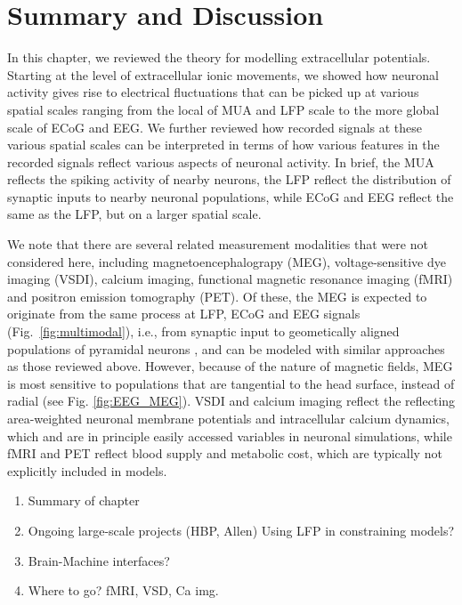 \documentclass[preprint,11pt,authoryear]{elsarticle}
\begin{document}
\section{Summary and Discussion}
\label{sec:summary}
In this chapter, we reviewed the theory for modelling extracellular potentials. Starting at the level of extracellular ionic movements, we showed how neuronal activity gives rise to electrical fluctuations that can be picked up at various spatial scales ranging from the local of MUA and LFP scale to the more global scale of ECoG and EEG. We further reviewed how recorded signals at these various spatial scales can be interpreted in terms of how various features in the recorded signals reflect various aspects of neuronal activity. In brief, the MUA reflects the spiking activity of nearby neurons, the LFP reflect the distribution of synaptic inputs to nearby neuronal populations, while ECoG and EEG reflect the same as the LFP, but on a larger spatial scale. 

We note that there are several related measurement modalities that were not considered here, including magnetoencephalograpy (MEG), voltage-sensitive dye imaging (VSDI), calcium imaging, functional magnetic resonance imaging (fMRI) and positron emission tomography (PET). Of these, the MEG is expected to originate from the same process at LFP, ECoG and EEG signals (Fig.~\ref{fig:multimodal}), i.e., from synaptic input to geometically aligned populations of pyramidal neurons \citep{Hamalainen1993}, and can be modeled with similar approaches as those reviewed above. However, because of the nature of magnetic fields, MEG is most sensitive to populations that are tangential to the head surface, instead of radial (see Fig. \ref{fig:EEG_MEG}). VSDI and calcium imaging reflect the reflecting area-weighted neuronal membrane potentials and intracellular calcium dynamics, which and are in principle easily accessed variables in neuronal simulations, while fMRI and PET reflect blood supply and metabolic cost, which are typically not explicitly included in models. 
 
\begin{enumerate}
 \item Summary of chapter
 \item Ongoing large-scale projects (HBP, Allen)
 \subitem Using LFP in constraining models?
 \item Brain-Machine interfaces?
 \item Where to go?
 \subitem fMRI, VSD, Ca img.
\end{enumerate}
\end{document}
